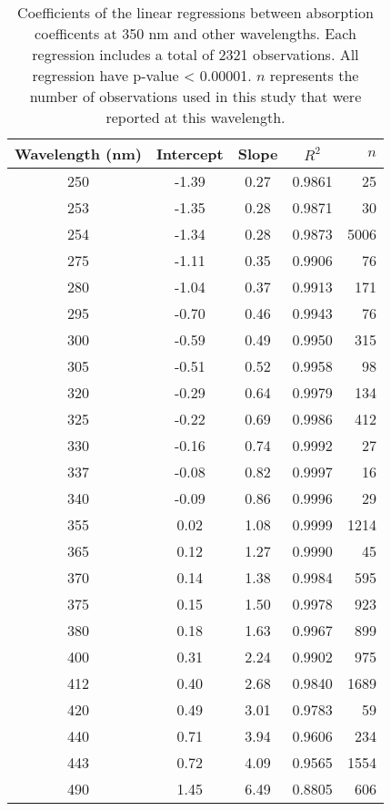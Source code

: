 \begin{table}[ht]
\centering
\begin{tabular}{ccccr}
  \hline
Wavelength (nm) & Intercept & Slope & $R^2$ & $n$ \\ 
  \hline
250 & -1.39 & 0.27 & 0.9861 & 25 \\ 
  253 & -1.35 & 0.28 & 0.9871 & 30 \\ 
  254 & -1.34 & 0.28 & 0.9873 & 5006 \\ 
  275 & -1.11 & 0.35 & 0.9906 & 76 \\ 
  280 & -1.04 & 0.37 & 0.9913 & 171 \\ 
  295 & -0.70 & 0.46 & 0.9943 & 76 \\ 
  300 & -0.59 & 0.49 & 0.9950 & 315 \\ 
  305 & -0.51 & 0.52 & 0.9958 & 98 \\ 
  320 & -0.29 & 0.64 & 0.9979 & 134 \\ 
  325 & -0.22 & 0.69 & 0.9986 & 412 \\ 
  330 & -0.16 & 0.74 & 0.9992 & 27 \\ 
  337 & -0.08 & 0.82 & 0.9997 & 16 \\ 
  340 & -0.09 & 0.86 & 0.9996 & 29 \\ 
  355 & 0.02 & 1.08 & 0.9999 & 1214 \\ 
  365 & 0.12 & 1.27 & 0.9990 & 45 \\ 
  370 & 0.14 & 1.38 & 0.9984 & 595 \\ 
  375 & 0.15 & 1.50 & 0.9978 & 923 \\ 
  380 & 0.18 & 1.63 & 0.9967 & 899 \\ 
  400 & 0.31 & 2.24 & 0.9902 & 975 \\ 
  412 & 0.40 & 2.68 & 0.9840 & 1689 \\ 
  420 & 0.49 & 3.01 & 0.9783 & 59 \\ 
  440 & 0.71 & 3.94 & 0.9606 & 234 \\ 
  443 & 0.72 & 4.09 & 0.9565 & 1554 \\ 
  490 & 1.45 & 6.49 & 0.8805 & 606 \\ 
   \hline
\end{tabular}
\caption{Coefficients of the linear regressions between absorption 
coefficents at 350 nm and other wavelengths. Each regression includes a total 
of 2321 observations. All regression have p-value < 0.00001.  $n$ represents 
the number of observations used in this study that were reported at this 
wavelength.} 
\end{table}
